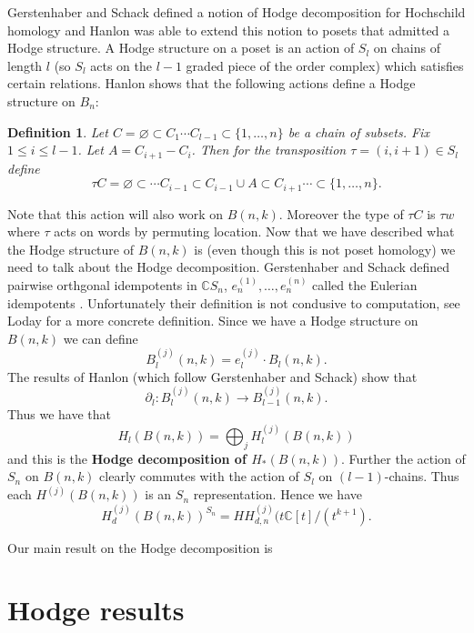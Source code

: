 \documentclass{article}
\newtheorem{definition}[theorem]{Definition}
\newcommand{\C}{\mathbb{C}}
\newcommand{\full}{\{1, \ldots, n\}}
\begin{document}
Gerstenhaber and Schack \cite{GS} defined a notion of Hodge decomposition for Hochschild homology and Hanlon \cite{Hanlon}
was able to extend this notion to posets that admitted a Hodge structure. A Hodge structure on a poset is an action of
$S_l$ on chains of length $l$ (so $S_l$ acts on the $l-1$ graded piece of the order complex) which satisfies certain 
relations. Hanlon shows that the following actions define a Hodge structure on $B_n$:
\begin{definition}
  Let $C =\varnothing \subset C_1 \cdots C_{l-1} \subset \full$ be a chain of subsets. Fix $1 \le i \le l-1$. 
  Let $A = C_{i+1} - C_i$. Then for the transposition $\tau = 
  (i, i+1) \in S_l$ define $$\tau C = \varnothing \subset \cdots C_{i-1} \subset C_{i-1} \cup A \subset C_{i+1} \cdots 
  \subset \full.$$
\end{definition}

Note that this action will also work on $B(n, k)$. Moreover the type of $\tau C$ is $\tau w$ where $\tau$ acts on words 
by permuting location. Now that we have described what the Hodge structure of $B(n, k)$ is (even though this is not poset
homology) we need to talk about the Hodge decomposition. Gerstenhaber and Schack defined pairwise orthgonal idempotents in
$\C S_n$, $e_n^{(1)}, \ldots, e_n^{(n)}$ called the Eulerian idempotents \cite{GS}. Unfortunately their definition is not
condusive to computation, see Loday \cite{Loday} for a more concrete definition. Since we have a Hodge structure on 
$B(n, k)$ we can define $$B_l^{(j)}(n, k) = e_l^{(j)} \cdot B_l(n, k).$$ The results of Hanlon (which follow Gerstenhaber
and Schack) show that $$\partial_l \colon B_l^{(j)}(n, k) \rightarrow B_{l-1}^{(j)}(n, k).$$ Thus we have that 
$$H_l(B(n, k)) = \bigoplus_j H_l^{(j)}(B(n, k))$$ and this is the {\bf Hodge decomposition of $H_*(B(n, k))$}. Further the
action of $S_n$ on $B(n, k)$ clearly commutes with the action of $S_l$ on $(l-1)$-chains. Thus each $H^{(j)}(B(n, k))$ is
an $S_n$ representation. Hence we have
\begin{equation}
  H_d^{(j)}(B(n, k))^{S_n} = HH_{d, n}^{(j)}(t\C[t]/(t^{k+1}).
\end{equation}

Our main result on the Hodge decomposition is 



\section{Hodge results}\label{S:Hodge}
\end{document}

